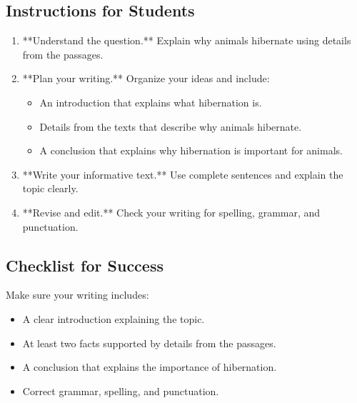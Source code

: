 \documentclass[12pt]{article}
\begin{document}
\subsection*{Instructions for Students}

\begin{enumerate}
    \item **Understand the question.** Explain why animals hibernate using details from the passages.
    \item **Plan your writing.** Organize your ideas and include:
    \begin{itemize}
        \item An introduction that explains what hibernation is.
        \item Details from the texts that describe why animals hibernate.
        \item A conclusion that explains why hibernation is important for animals.
    \end{itemize}
    \item **Write your informative text.** Use complete sentences and explain the topic clearly.
    \item **Revise and edit.** Check your writing for spelling, grammar, and punctuation.
\end{enumerate}

\subsection*{Checklist for Success}

Make sure your writing includes:
\begin{itemize}
    \item A clear introduction explaining the topic.
    \item At least two facts supported by details from the passages.
    \item A conclusion that explains the importance of hibernation.
    \item Correct grammar, spelling, and punctuation.
\end{itemize}
\end{document}
